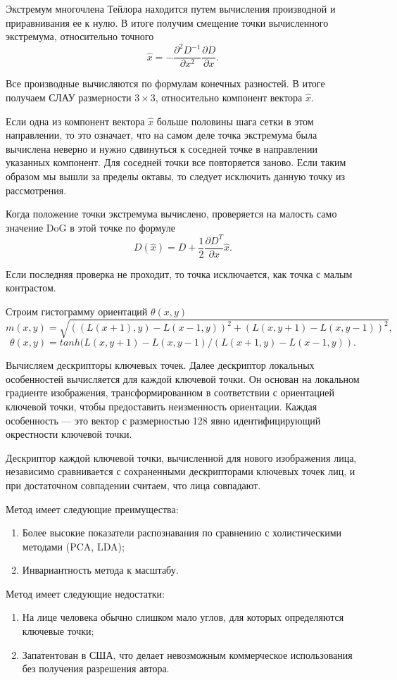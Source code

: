 Экстремум многочлена Тейлора находится путем вычисления производной и
приравнивания ее к нулю. В итоге получим смещение точки вычисленного экстремума,
относительно точного
$$ \widehat{x} = -\frac{\partial^2D^{-1}}{\partial x^2}\frac{\partial D}{\partial x}. $$

Все производные вычисляются по формулам конечных разностей. В итоге получаем
СЛАУ размерности $3 \times 3$, относительно компонент вектора $\widehat{x}$.


Если одна из компонент вектора $\widehat{x}$ больше половины шага сетки в этом
направлении, то это означает, что на самом деле точка экстремума была вычислена
неверно и нужно сдвинуться к соседней точке в направлении указанных
компонент. Для соседней точки все повторяется заново. Если таким образом мы
вышли за пределы октавы, то следует исключить данную точку из рассмотрения.


Когда положение точки экстремума вычислено, проверяется на малость само значение
DoG в этой точке по формуле
$$ D(\widehat{x}) = D + \frac{1}{2}\frac{\partial D^T}{\partial x}\widehat{x}. $$

Если последняя проверка не проходит, то точка исключается, как точка с малым
контрастом.


Строим гистограмму ориентаций $\theta(x,y)$
$$m(x,y) = \sqrt{((L(x+1),y) - L(x-1,y))^2 + (L(x,y+1)-L(x,y-1))^2}, $$
$$\theta(x,y) = tanh(L(x,y+1) - L(x,y-1) / (L(x+1,y) - L(x-1,y)). $$

Вычисляем дескрипторы ключевых точек. Далее дескриптор локальных
особенностей вычисляется для каждой ключевой точки. Он основан на локальном
градиенте изображения, трансформированном в соответствии с ориентацией ключевой
точки, чтобы предоставить неизменность ориентации. Каждая особенность --- это
вектор с размерностью 128 явно идентифицирующий окрестности ключевой точки.


Дескриптор каждой ключевой точки, вычисленной для нового изображения лица,
независимо сравнивается с сохраненными дескрипторами ключевых точек лиц, и при
достаточном совпадении считаем, что лица совпадают.

Метод имеет следующие преимущества:
\begin{enumerate}
\item Более высокие показатели распознавания по сравнению с холистическими
методами (PCA, LDA);
\item Инвариантность метода к масштабу.
\end{enumerate}

Метод имеет следующие недостатки:
\begin{enumerate}
\item На лице человека обычно слишком мало углов, для которых определяются
ключевые точки;
\item Запатентован в США, что делает невозможным коммерческое использования без
получения разрешения автора.
\end{enumerate}

